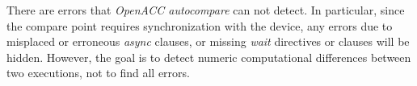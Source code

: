 There are errors that \emph{OpenACC autocompare} can not detect.
In particular, since the compare point requires synchronization with the device, any errors due to misplaced or erroneous \emph{async} clauses, or missing \emph{wait} directives or clauses will be hidden.
However, the goal is to detect numeric computational differences between two executions, not to find all errors.
